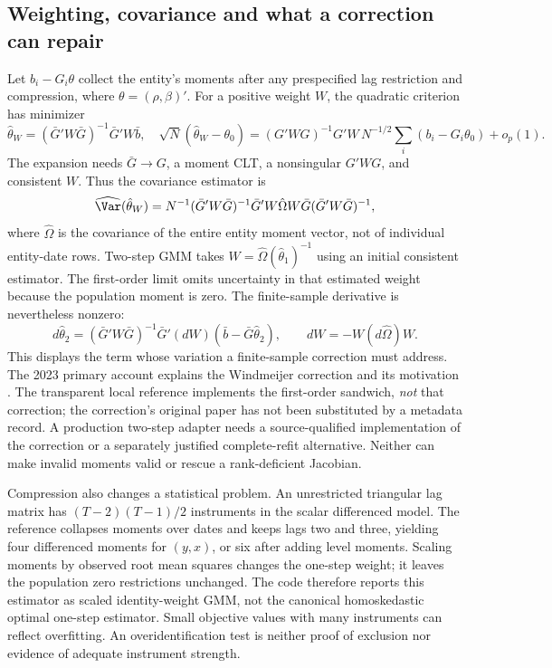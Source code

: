 \subsection{Weighting, covariance and what a correction can repair}
Let $b_i-G_i\theta$ collect the entity's moments after any prespecified lag
restriction and compression, where $\theta=(\rho,\beta)'$. For a positive
weight $W$, the quadratic criterion has minimizer
\[
 \hat\theta_W=(\bar G'W\bar G)^{-1}\bar G'W\bar b,
 \quad
 \sqrt N(\hat\theta_W-\theta_0)=
 (G'WG)^{-1}G'W\,N^{-1/2}\sum_i(b_i-G_i\theta_0)+o_p(1).
\]
The expansion needs $\bar G\to G$, a moment CLT, a nonsingular $G'WG$,
and consistent $W$. Thus the covariance estimator is
\[
 \widehat{\Var}(\hat\theta_W)=N^{-1}
 (\bar G'W\bar G)^{-1}\bar G'W\hat\Omega W\bar G
 (\bar G'W\bar G)^{-1},
\]
where $\hat\Omega$ is the covariance of the entire entity moment vector,
not of individual entity-date rows. Two-step GMM takes
$W=\hat\Omega(\hat\theta_1)^{-1}$ using an initial consistent estimator.
The first-order limit omits uncertainty in that estimated weight because
the population moment is zero. The finite-sample derivative is nevertheless
nonzero:
\[
 d\hat\theta_2=(\bar G'W\bar G)^{-1}\bar G'(dW)
 (\bar b-\bar G\hat\theta_2),\qquad
 dW=-W(d\hat\Omega)W.
\]
This displays the term whose variation a finite-sample correction must
address. The 2023 primary account explains the Windmeijer correction and its
motivation \citep[Section 2.3, p.105]{blundellbond2023}. The transparent local
reference implements the first-order sandwich, \emph{not} that correction;
the correction's original paper has not been substituted by a metadata record.
A production two-step adapter needs a source-qualified implementation of the
correction or a separately justified complete-refit alternative. Neither can
make invalid moments valid or rescue a rank-deficient Jacobian.

Compression also changes a statistical problem. An unrestricted triangular
lag matrix has $(T-2)(T-1)/2$ instruments in the scalar differenced model.
The reference collapses moments over dates and keeps lags two and three,
yielding four differenced moments for $(y,x)$, or six after adding level
moments. Scaling moments by observed root mean squares changes the one-step
weight; it leaves the population zero restrictions unchanged. The code
therefore reports this estimator as scaled identity-weight GMM, not the
canonical homoskedastic optimal one-step estimator. Small objective values
with many instruments can reflect overfitting. An overidentification test
is neither proof of exclusion nor evidence of adequate instrument strength.


